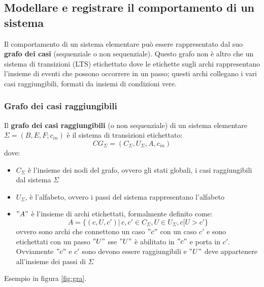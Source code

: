 \subsection{Modellare e registrare il comportamento di un sistema}
Il comportamento di un sistema elementare può essere rappresentato dal suo \textbf{grafo dei casi} (sequenziale o non sequenziale).
Questo grafo non è altro che un sistema di transizioni (LTS) etichettato dove le etichette sugli archi
rappresentano l’insieme di eventi che possono occorrere in un passo; questi archi collegano i vari
casi raggiungibili, formati da insiemi di condizioni vere.
\newpage
\subsubsection{Grafo dei casi raggiungibili}
\begin{definizione}
  Il \textbf{grafo dei casi raggiungibili} (o non sequenziale) di un sistema elementare
  $\Sigma=(B, E, F;c_{in})$ è il sistema di transizioni etichettato:
  \[CG_\Sigma=(C_\Sigma, U_\Sigma, A, c_{in})\]
  dove:
  \begin{itemize}
    \item $C_\Sigma$ è l'insieme dei nodi del grafo, ovvero gli stati globali,
    i casi raggiungibili dal sistema $\Sigma$    
    \item $U_\Sigma$, è l'alfabeto, ovvero i passi del sistema rappresentano
    l'alfabeto 
    \item $"A"$ è l'insieme di archi etichettati, formalmente definito come:
    \[A=\{(c, U, c')|\, c, c'\in C_\Sigma, U\in U_\Sigma, c[U>c'\}\]
    ovvero sono archi che connettono un caso $"c"$ con un caso $c'$ e sono
    etichettati con un passo $"U"$ sse $"U"$ è abilitato in $"c"$ e porta in
    $c'$. Ovviamente $"c"$ e $c'$ sono devono essere raggiungibili e $"U"$ deve
    appartenere all'insieme dei passi di $\Sigma$
  \end{itemize}
  Esempio in figura \ref{fig:gra}.
\end{definizione} \vspace{5mm} %
